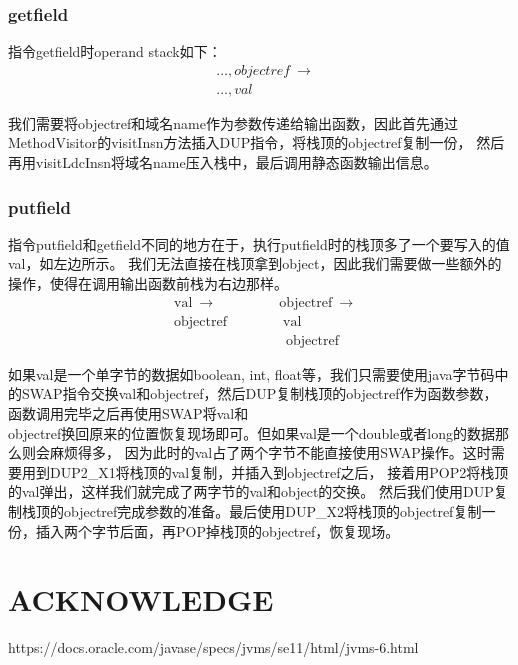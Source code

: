 \documentclass[UTF8]{article}
\begin{document}
\subsubsection{getfield}
指令getfield时operand stack如下：
\begin{equation*}
    \begin{split}
        &\ldots, objectref\ \rightarrow\\
        &\ldots, val
    \end{split}
\end{equation*}

我们需要将objectref和域名name作为参数传递给输出函数，因此首先通过MethodVisitor的visitInsn方法插入DUP指令，将栈顶的objectref复制一份，
然后再用visitLdcInsn将域名name压入栈中，最后调用静态函数输出信息。

\subsubsection{putfield}
指令putfield和getfield不同的地方在于，执行putfield时的栈顶多了一个要写入的值val，如左边所示。
我们无法直接在栈顶拿到object，因此我们需要做一些额外的操作，使得在调用输出函数前栈为右边那样。
\begin{equation*}
    \begin{split}
        &\text{val}\ \rightarrow\qquad\qquad\ \  \text{objectref}\ \rightarrow\\
        &\text{objectref}\qquad\qquad \text{val}\\
        &\qquad\qquad\qquad\qquad\text{objectref}
    \end{split}
\end{equation*}

如果val是一个单字节的数据如boolean, int, float等，我们只需要使用java字节码中的SWAP指令交换val和objectref，然后DUP复制栈顶的objectref作为函数参数，
函数调用完毕之后再使用SWAP将val和\\objectref换回原来的位置恢复现场即可。但如果val是一个double或者long的数据那么则会麻烦得多，
因为此时的val占了两个字节不能直接使用SWAP操作。这时需要用到DUP2\_X1将栈顶的val复制，并插入到objectref之后，
接着用POP2将栈顶的val弹出，这样我们就完成了两字节的val和object的交换。
然后我们使用DUP复制栈顶的objectref完成参数的准备。最后使用DUP\_X2将栈顶的objectref复制一份，插入两个字节后面，再POP掉栈顶的objectref，恢复现场。



\section{ACKNOWLEDGE}
https://docs.oracle.com/javase/specs/jvms/se11/html/jvms-6.html
\end{document}
